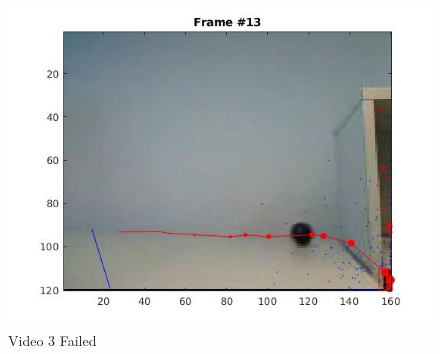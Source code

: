 \documentclass[paper=a4, fontsize=11pt]{scrartcl} %
\numberwithin{equation}{section} %
\numberwithin{figure}{section} %
\numberwithin{table}{section} %
\begin{document}
\begin{figure}
  \centering
  \includegraphics[width=.9\linewidth]{video3_fail.jpg}


\caption{Video 3 Failed}
\label{fig:v3_f}
\end{figure}
\end{document}

